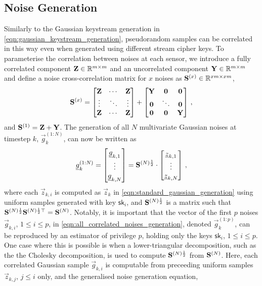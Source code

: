 \documentclass[letterpaper, 10 pt, conference]{ieeeconf}
\begin{document}
\subsection{Noise Generation}\label{subsec:noise_gen}
Similarly to the Gaussian keystream generation in \eqref{eqn:gaussian_keystream_generation}, pseudorandom samples can be correlated in this way even when generated using different stream cipher keys. To parameterise the correlation between noises at each sensor, we introduce a fully correlated component ${{\mathbf{Z}}}\in\mathbb{R}^{m\times m}$ and an uncorrelated component ${{\mathbf{Y}}}\in\mathbb{R}^{m\times m}$ and define a noise cross-correlation matrix for $x$ noises as ${{\mathbf{S}}}^{(x)} \in \mathbb{R}^{xm\times xm}$,
\begin{equation}\label{eqn:noise_correlation_matrix}
  {\ensuremath{{\mathbf{S}}}}^{(x)}=
  \begin{bmatrix}
    {\ensuremath{{\mathbf{Z}}}} & \cdots & {{\mathbf{Z}}}\\
    \vdots & \ddots & \vdots\\
    {{\mathbf{Z}}} & \cdots & {{\mathbf{Z}}}\\
  \end{bmatrix}+
  \begin{bmatrix}
    {\ensuremath{{\mathbf{Y}}}} & {{\mathbf{0}}} & {{\mathbf{0}}}\\
    {{\mathbf{0}}} & \ddots & {{\mathbf{0}}}\\
    {{\mathbf{0}}} & {{\mathbf{0}}} & {{\mathbf{Y}}}\\
  \end{bmatrix}\,,
\end{equation}
and ${{\mathbf{S}}}^{(1)}={{\mathbf{Z}}}+{{\mathbf{Y}}}$. The generation of all $N$ multivariate Gaussian noises at timestep $k$, $\vec{g}_k^{(1:N)}$, can now be written as
\begin{equation}\label{eqn:all_correlated_noises_generation}
  {\underline{g}}_k^{(1:N)}=
  \begin{bmatrix}
    {\underline{g}}_{k,1}\\
    \vdots\\
    {\underline{g}}_{k,N}
  \end{bmatrix}=
  {{\mathbf{S}}}^{(N)\frac{1}{2}}\cdot
  \begin{bmatrix}
    {\underline{z}}_{k,1}\\
    \vdots\\
    {\underline{z}}_{k,N}
  \end{bmatrix}\,,
\end{equation}
where each $\vec{z}_{k,i}$ is computed as $\vec{z}_k$ in \eqref{eqn:standard_gaussian_generation} using uniform samples generated with key $\mathsf{sk}_i$, and ${{\mathbf{S}}}^{(N)\frac{1}{2}}$ is a matrix such that ${{\mathbf{S}}}^{(N)\frac{1}{2}}{{\mathbf{S}}}^{(N)\frac{1}{2}\top}={{\mathbf{S}}}^{(N)}$. Notably, it is important that the vector of the first $p$ noises $\vec{g}_{k,i}$, $1\leq i \leq p$, in \eqref{eqn:all_correlated_noises_generation}, denoted $\vec{g}_k^{(1:p)}$, can be reproduced by an estimator of privilege $p$, holding only the keys $\mathsf{sk}_i$, $1\leq i \leq p$. One case where this is possible is when a lower-triangular decomposition, such as the the Cholesky decomposition, is used to compute ${{\mathbf{S}}}^{(N)\frac{1}{2}}$ from ${{\mathbf{S}}}^{(N)}$. Here, each correlated Gaussian sample $\vec{g}_{k,i}$ is computable from preceeding uniform samples $\vec{z}_{k,j}$, $j\leq i$ only, and the generalised noise generation equation,
\end{document}
